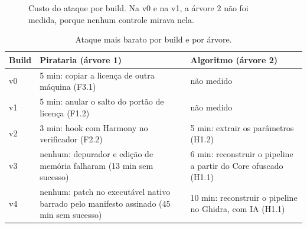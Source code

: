 \begin{figure}[htbp]
\centering
{}
\caption{Custo do ataque por build. Na v0 e na v1, a árvore 2 não foi medida, porque nenhum controle mirava nela.}
\label{fig:custo}
\end{figure}

\begin{table}[htbp]
\centering
\caption{Ataque mais barato por build e por árvore.}
\label{qd:custo}
\small
\begin{tabular}{lL{6.3cm}L{6.3cm}}
\toprule
Build & Pirataria (árvore 1) & Algoritmo (árvore 2) \\
\midrule
v0 & 5 min: copiar a licença de outra máquina (F3.1) & não medido \\
v1 & 5 min: anular o salto do portão de licença (F1.2) & não medido \\
v2 & 3 min: hook com Harmony no verificador (F2.2) & 5 min: extrair os parâmetros (H1.2) \\
v3 & nenhum: depurador e edição de memória falharam (13 min sem sucesso) & 6 min: reconstruir o pipeline a partir do Core ofuscado (H1.1) \\
v4 & nenhum: patch no executável nativo barrado pelo manifesto assinado (45 min sem sucesso) & 10 min: reconstruir o pipeline no Ghidra, com IA (H1.1) \\
\bottomrule
\end{tabular}
\end{table}

